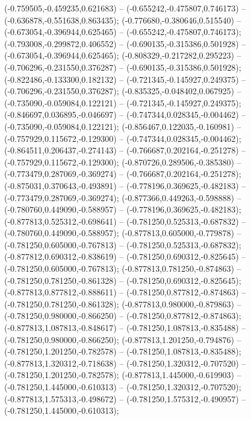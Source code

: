  (-0.759505,-0.459235,0.621683) -- (-0.655242,-0.475807,0.746173) -- (-0.636878,-0.551638,0.863435);
 (-0.776680,-0.380646,0.515540) -- (-0.673054,-0.396944,0.625465) -- (-0.655242,-0.475807,0.746173);
 (-0.793008,-0.299872,0.406552) -- (-0.690135,-0.315386,0.501928) -- (-0.673054,-0.396944,0.625465);
 (-0.808329,-0.217282,0.295223) -- (-0.706296,-0.231550,0.376287) -- (-0.690135,-0.315386,0.501928);
 (-0.822486,-0.133300,0.182132) -- (-0.721345,-0.145927,0.249375) -- (-0.706296,-0.231550,0.376287);
 (-0.835325,-0.048402,0.067925) -- (-0.735090,-0.059084,0.122121) -- (-0.721345,-0.145927,0.249375);
 (-0.846697,0.036895,-0.046697) -- (-0.747344,0.028345,-0.004462) -- (-0.735090,-0.059084,0.122121);
 (-0.856467,0.122035,-0.160981) -- (-0.757929,0.115672,-0.129300) -- (-0.747344,0.028345,-0.004462);
 (-0.864511,0.206437,-0.274143) -- (-0.766687,0.202164,-0.251278) -- (-0.757929,0.115672,-0.129300);
 (-0.870726,0.289506,-0.385380) -- (-0.773479,0.287069,-0.369274) -- (-0.766687,0.202164,-0.251278);
 (-0.875031,0.370643,-0.493891) -- (-0.778196,0.369625,-0.482183) -- (-0.773479,0.287069,-0.369274);
 (-0.877366,0.449263,-0.598888) -- (-0.780760,0.449090,-0.588957) -- (-0.778196,0.369625,-0.482183);
 (-0.877813,0.525312,-0.698641) -- (-0.781250,0.525313,-0.687832) -- (-0.780760,0.449090,-0.588957);
 (-0.877813,0.605000,-0.779878) -- (-0.781250,0.605000,-0.767813) -- (-0.781250,0.525313,-0.687832);
 (-0.877812,0.690312,-0.838619) -- (-0.781250,0.690312,-0.825645) -- (-0.781250,0.605000,-0.767813);
 (-0.877813,0.781250,-0.874863) -- (-0.781250,0.781250,-0.861328) -- (-0.781250,0.690312,-0.825645);
 (-0.877813,0.877812,-0.888611) -- (-0.781250,0.877812,-0.874863) -- (-0.781250,0.781250,-0.861328);
 (-0.877813,0.980000,-0.879863) -- (-0.781250,0.980000,-0.866250) -- (-0.781250,0.877812,-0.874863);
 (-0.877813,1.087813,-0.848617) -- (-0.781250,1.087813,-0.835488) -- (-0.781250,0.980000,-0.866250);
 (-0.877813,1.201250,-0.794876) -- (-0.781250,1.201250,-0.782578) -- (-0.781250,1.087813,-0.835488);
 (-0.877813,1.320312,-0.718638) -- (-0.781250,1.320312,-0.707520) -- (-0.781250,1.201250,-0.782578);
 (-0.877813,1.445000,-0.619903) -- (-0.781250,1.445000,-0.610313) -- (-0.781250,1.320312,-0.707520);
 (-0.877813,1.575313,-0.498672) -- (-0.781250,1.575312,-0.490957) -- (-0.781250,1.445000,-0.610313);
